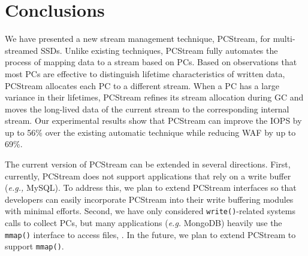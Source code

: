 \section{Conclusions}

We have presented a new stream management technique, \textsf{\small PCStream},
for multi-streamed SSDs.  Unlike existing techniques, \textsf{\small PCStream}
fully automates the process of mapping data to a stream based on PCs.  Based on
observations that most PCs are effective to distinguish lifetime
characteristics of written data, \textsf{\small PCStream} allocates each PC to
a different stream.  When a PC has a large variance in their lifetimes,
\textsf{\small PCStream} refines its stream allocation during GC and moves the
long-lived data of the current stream to the corresponding internal stream.
Our experimental results show that \textsf{\small PCStream} can improve the
IOPS by up to 56\% over the existing automatic technique while reducing WAF by
up to 69\%. 

The current version of \textsf{\small PCStream} can be extended in several
directions.  First, currently, PCStream does not support applications that rely
on a write buffer ({\it e.g.,} MySQL). To address this, we plan to extend
PCStream interfaces so that developers can easily incorporate PCStream into
their write buffering modules with minimal efforts.  Second, we have only
considered \texttt{write()}-related systems calls to collect PCs, but many
applications ({\it e.g.} MongoDB) heavily use the \texttt{mmap()} interface to
access files, . In the future, we plan to extend PCStream to support
\texttt{mmap()}.
